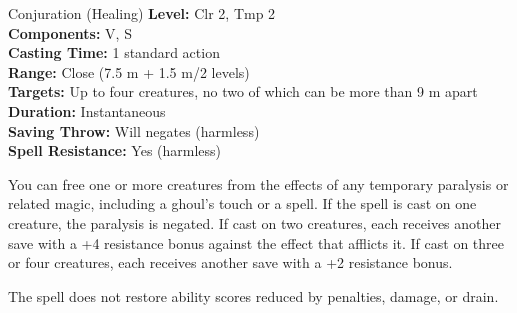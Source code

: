 {Conjuration (Healing)}
{
	\textbf{Level:}
	Clr 2, Tmp 2\\
	\textbf{Components:}
	V, S\\
	\textbf{Casting Time:}
	1 standard action\\
	\textbf{Range:}
	Close (7.5 m + 1.5 m/2 levels)\\
	\textbf{Targets:}
	Up to four creatures, no two of which can be more than 9 m apart\\
	\textbf{Duration:}
	Instantaneous\\
	\textbf{Saving Throw:}
	Will negates (harmless)\\
	\textbf{Spell Resistance:}
	Yes (harmless)\\
}
{
	You can free one or more creatures from the effects of any temporary paralysis or related magic, including a ghoul's touch or a  spell. If the spell is cast on one creature, the paralysis is negated. If cast on two creatures, each receives another save with a +4 resistance bonus against the effect that afflicts it. If cast on three or four creatures, each receives another save with a +2 resistance bonus.

	The spell does not restore ability scores reduced by penalties, damage, or drain.

}
